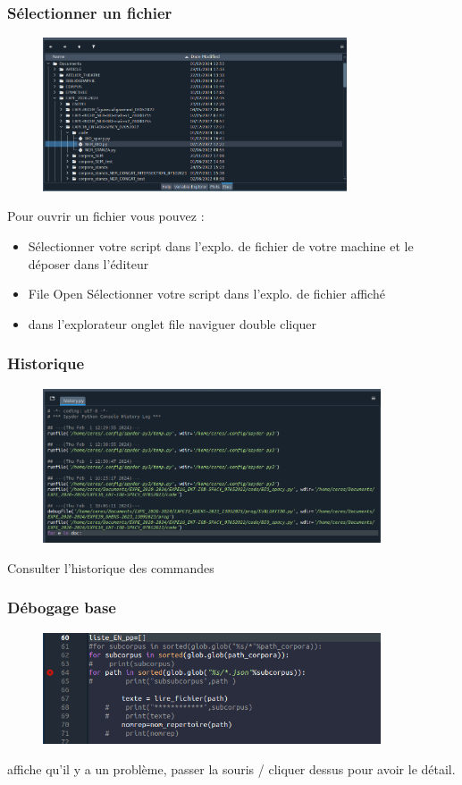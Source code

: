 \begin{frame}
  \frametitle{Sélectionner un fichier}
  \begin{figure}
  \includegraphics[width=9cm]{images/spyder_Files.png}
  \end{figure}
  \vspace{-0.3cm}
  Pour ouvrir un fichier vous pouvez :
  \begin{itemize}
  \item {} Sélectionner votre script dans l'explo. de fichier de votre machine et le déposer dans l'éditeur
  \item {} File  Open  Sélectionner votre script dans l'explo. de fichier affiché 
  \item {} dans l'explorateur onglet  file  naviguer  double cliquer
  \end{itemize}
  \end{frame}

\begin{frame}
  \frametitle{Historique}
  \begin{figure}
  \includegraphics[width=10cm]{images/spyder_hystory}
	\end{figure} 
	 Consulter l'historique des commandes  
  \end{frame}
  
\begin{frame}
  \frametitle{Débogage base}
  \begin{figure}
  \includegraphics[width=10cm]{images/spyder_signal_erreur.png}
	\end{figure} 
	 affiche qu'il y a un problème, passer la souris / cliquer dessus pour avoir le détail. 
  \end{frame}
  
